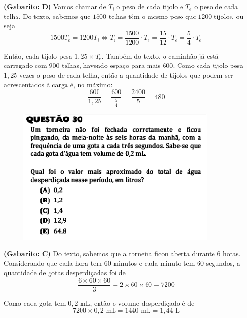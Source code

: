 \documentclass[a4paper]{article}
\begin{document}
\par\textbf{(Gabarito: D)} Vamos chamar de $T_i$ o peso de cada tijolo e $T_e$ o peso de cada telha. Do texto, sabemos que $1500$ telhas têm o mesmo peso que $1200$ tijolos, ou seja:
\begin{equation*}
1500T_e = 1200T_i \iff T_i = \frac{1500}{1200}\cdot T_e = \frac{15}{12}\cdot T_e = \frac{5}{4}\cdot T_e
\end{equation*}
\par\vspace{0.3cm} Então, cada tijolo pesa $1,25\times T_e$. Também do texto, o caminhão já está carregado com $900$ telhas, havendo espaço para mais $600$. Como cada tijolo pesa $1,25$ vezes o peso de cada telha, então a quantidade de tijolos que podem ser acrescentados à carga é, no máximo:
\begin{equation*}
\frac{600}{1,25} = \frac{600}{\frac{5}{4}} = \frac{2400}{5} = 480
\end{equation*}
\begin{figure}[H]
	\begin{center}
		\includegraphics[width=10cm]{L2Q30.png}
	\end{center}
\end{figure}
\par\textbf{(Gabarito: C)} Do texto, sabemos que a torneira ficou aberta durante $6$ horas. Considerando que cada hora tem $60$ minutos e cada minuto tem $60$ segundos, a quantidade de gotas desperdiçadas foi de
\begin{equation*}
\frac{6\times 60\times 60}{3} = 2\times 60 \times 60 = 7200
\end{equation*}
\par\vspace{0.3cm} Como cada gota tem $0,2$ mL, então o volume desperdiçado é de
\begin{equation*}
7200\times 0,2 \text{ mL} = 1440\text{ mL} = 1,44\text{ L}
\end{equation*}
\end{document}
